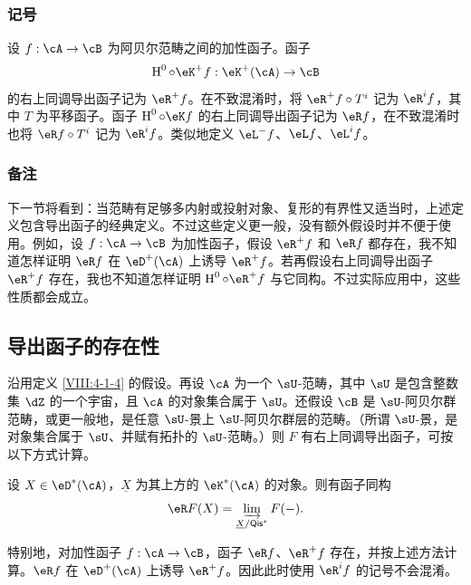 \subsubsection{记号}\label{VIII:4-1-5}
设 $f:\cA\to\cB$ 为阿贝尔范畴之间的加性函子。函子
\[\h^0\circ\eK^+f:\eK^+(\cA)\to\cB\]
的右上同调导出函子记为 $\eR^+f$。在不致混淆时，将 $\eR^+f\circ T^i$ 记为 $\eR^if$，其中 $T$ 为平移函子。函子 $\h^0\circ\eK f$ 的右上同调导出函子记为 $\eR f$，在不致混淆时也将 $\eR f\circ T^i$ 记为 $\eR^if$。类似地定义 $\eL^-f$、$\eL f$、$\eL^if$。
\subsubsection{备注}\label{VIII:4-1-6}
下一节将看到：当范畴有足够多内射或投射对象、复形的有界性又适当时，上述定义包含导出函子的经典定义。不过这些定义更一般，没有额外假设时并不便于使用。例如，设 $f:\cA\to\cB$ 为加性函子，假设 $\eR^+f$ 和 $\eR f$ 都存在，我不知道怎样证明 $\eR f$ 在 $\eD^+(\cA)$ 上诱导 $\eR^+f$。若再假设右上同调导出函子 $\eR^+f$ 存在，我也不知道怎样证明 $\h^0\circ\eR^+f$ 与它同构。不过实际应用中，这些性质都会成立。
\subsection{导出函子的存在性}\label{VIII:4-2}
\begin{proposition}\label{VIII:4-2-1}
沿用定义 \ref{VIII:4-1-4} 的假设。再设 $\cA$ 为一个 $\sU$-范畴，其中 $\sU$ 是包含整数集 $\dZ$ 的一个宇宙，且 $\cA$ 的对象集合属于 $\sU$。还假设 $\cB$ 是 $\sU$-阿贝尔群范畴，或更一般地，是任意 $\sU$-景上 $\sU$-阿贝尔群层的范畴。（所谓 $\sU$-景，是对象集合属于 $\sU$、并赋有拓扑的 $\sU$-范畴。）则 $F$ 有右上同调导出函子，可按以下方式计算。

设 $X\in\eD^\ast(\cA)$，$\underline X$ 为其上方的 $\eK^\ast(\cA)$ 的对象。则有函子同构
\[\eR F(X)=\varinjlim_{\underline X/\mathsf{Qis}^\ast}F(-).\]
\end{proposition}
特别地，对加性函子 $f:\cA\to\cB$，函子 $\eR f$、$\eR^+f$ 存在，并按上述方法计算。$\eR f$ 在 $\eD^+(\cA)$ 上诱导 $\eR^+f$。因此此时使用 $\eR^if$ 的记号不会混淆。

